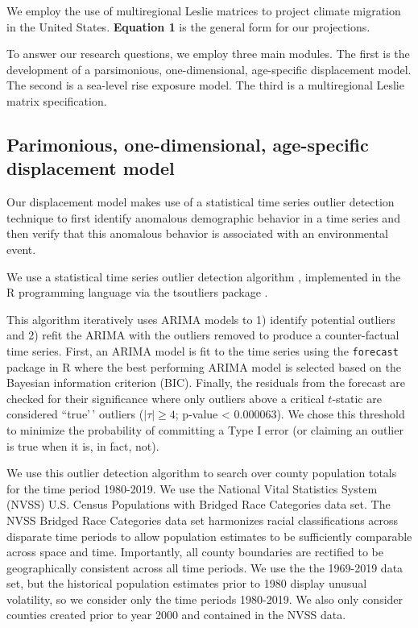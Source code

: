 \documentclass[12pt]{article}
\begin{document}
We employ the use of multiregional Leslie matrices
\citep{rogers1966multiregional} to project climate migration in the
United States. \textbf{Equation 1} is the general form for our
projections.

To answer our research questions, we employ three main modules. The
first is the development of a parsimonious, one-dimensional,
age-specific displacement model. The second is a sea-level rise exposure
model. The third is a multiregional Leslie matrix specification.

\hypertarget{parimonious-one-dimensional-age-specific-displacement-model}{%
\subsection{Parimonious, one-dimensional, age-specific displacement
model}\label{parimonious-one-dimensional-age-specific-displacement-model}}

Our displacement model makes use of a statistical time series outlier
detection technique to first identify anomalous demographic behavior in
a time series and then verify that this anomalous behavior is associated
with an environmental event.

We use a statistical time series outlier detection algorithm
\citep{chen1993joint}, implemented in the R programming language
\citep{rcore} via the tsoutliers package \citep{tsoutliers2019}.

This algorithm iteratively uses ARIMA models to 1) identify potential
outliers and 2) refit the ARIMA with the outliers removed to produce a
counter-factual time series. First, an ARIMA model is fit to the time
series using the \texttt{forecast} package in R
\citep[\citet{hymdman2008}]{Rforecast} where the best performing ARIMA
model is selected based on the Bayesian information criterion (BIC).
Finally, the residuals from the forecast are checked for their
significance where only outliers above a critical \(t\)-static are
considered ``true'\,' outliers (\(|\tau| \geq 4\); p-value \textless{}
0.000063). We chose this threshold to minimize the probability of
committing a Type I error (or claiming an outlier is true when it is, in
fact, not).

We use this outlier detection algorithm to search over county population
totals for the time period 1980-2019. We use the National Vital
Statistics System (NVSS) U.S. Census Populations with Bridged Race
Categories data set. The NVSS Bridged Race Categories data set
harmonizes racial classifications across disparate time periods to allow
population estimates to be sufficiently comparable across space and
time. Importantly, all county boundaries are rectified to be
geographically consistent across all time periods. We use the the
1969-2019 data set, but the historical population estimates prior to
1980 display unusual volatility, so we consider only the time periods
1980-2019. We also only consider counties created prior to year 2000 and
contained in the NVSS data.
\end{document}
